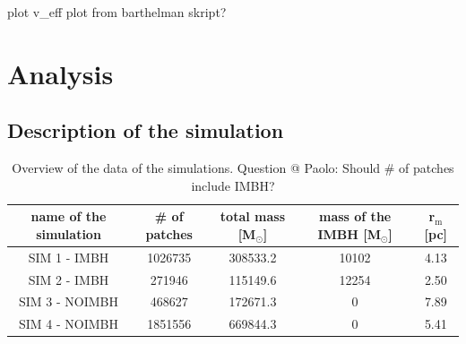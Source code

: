 \documentclass[a4paper,12pt,abstracton]{scrartcl}
\begin{document}
\color{red} plot v\_eff plot from barthelman skript? \color{black}

\newpage
\section{Analysis}

\subsection{Description of the simulation}
\begin{table}[htbp]
\centering
\begin{tabular}{ c | c | c | c | c }
name of the simulation & \# of patches & total mass [M\(_\odot\)]& \makecell{mass of the \\ \ac{IMBH} [M\(_\odot\)]}& r\(_\mathrm{m}\) [pc]\\
\hline			
  SIM 1 - IMBH & 1026735 & 308533.2 & 10102 & 4.13 \\
  SIM 2 - IMBH & 271946& 115149.6 & 12254 & 2.50\\
  SIM 3 - NOIMBH & 468627& 172671.3& 0 & 7.89\\
  SIM 4 - NOIMBH & 1851556& 669844.3& 0 & 5.41\\

\end{tabular}
\caption{Overview of the data of the simulations.\color{red} Question @ Paolo: Should \# of patches include IMBH? \color{black}}
\end{table}
\end{document}
